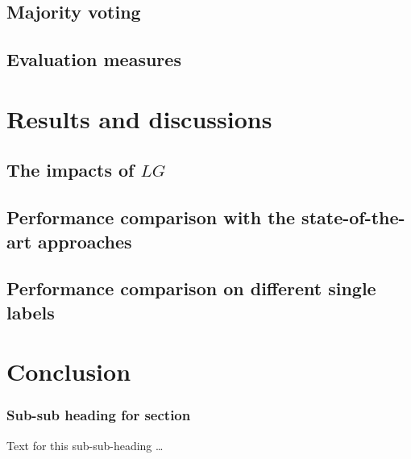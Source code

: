 \documentclass{bmcart}
\begin{document}
\subsection*{Majority voting} 

\subsection*{Evaluation measures}

\section*{Results and discussions}
\subsection*{The impacts of $LG$}

\subsection*{Performance comparison with the state-of-the-art approaches}

\subsection*{Performance comparison on different single labels}



\section*{Conclusion}


\subsubsection*{Sub-sub heading for section}
Text for this sub-sub-heading \ldots
\end{document}
